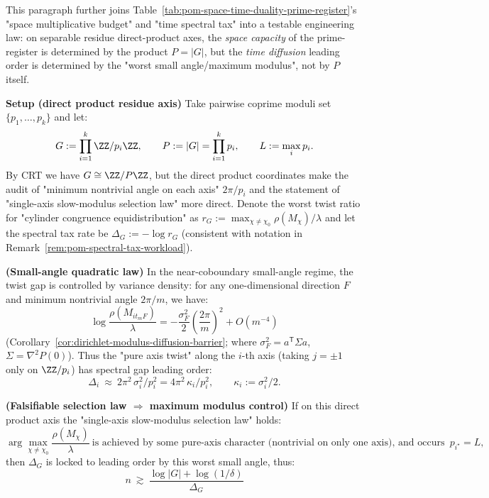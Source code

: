 \begin{remark}\label{rem:pom-max-modulus-control-law}
This paragraph further joins Table~\ref{tab:pom-space-time-duality-prime-register}'s "space multiplicative budget" and "time spectral tax" into a testable engineering law: on separable residue direct-product axes, the \emph{space capacity} of the prime-register is determined by the product $P=|G|$, but the \emph{time diffusion} leading order is determined by the "worst small angle/maximum modulus", not by $P$ itself.
\par
\medskip\noindent\textbf{Setup (direct product residue axis)}
Take pairwise coprime moduli set $\{p_1,\dots,p_k\}$ and let:
\[
G:=\prod_{i=1}^k\ZZ/p_i\ZZ,
\qquad
P:=|G|=\prod_{i=1}^k p_i,
\qquad
L:=\max_i p_i.
\]
By CRT we have $G\cong \ZZ/P\ZZ$, but the direct product coordinates make the audit of "minimum nontrivial angle on each axis" $2\pi/p_i$ and the statement of "single-axis slow-modulus selection law" more direct.
Denote the worst twist ratio for "cylinder congruence equidistribution" as
\(
r_G:=\max_{\chi\neq\chi_0}\rho(M_\chi)/\lambda
\)
and let the spectral tax rate be
\(
\Delta_G:=-\log r_G
\)
(consistent with notation in Remark~\ref{rem:pom-spectral-tax-workload}).
\par
\medskip\noindent\textbf{(Small-angle quadratic law)}
In the near-coboundary small-angle regime, the twist gap is controlled by variance density: for any one-dimensional direction $F$ and minimum nontrivial angle $2\pi/m$, we have:
\[
\log\frac{\rho(M_{it_mF})}{\lambda}
=-\frac{\sigma_F^2}{2}\left(\frac{2\pi}{m}\right)^2+O(m^{-4})
\]
(Corollary~\ref{cor:dirichlet-modulus-diffusion-barrier}; where $\sigma_F^2=a^{\mathsf T}\Sigma a$, $\Sigma=\nabla^2P(0)$).
Thus the "pure axis twist" along the $i$-th axis (taking $j=\pm1$ only on $\ZZ/p_i$) has spectral gap leading order:
\[
\Delta_i\ \approx\ 2\pi^2\,\sigma_i^2/p_i^2
=4\pi^2\,\kappa_i/p_i^2,
\qquad \kappa_i:=\sigma_i^2/2.
\]
\par
\medskip\noindent\textbf{(Falsifiable selection law $\Rightarrow$ maximum modulus control)}
If on this direct product axis the "single-axis slow-modulus selection law" holds:
\[
\arg\max_{\chi\neq\chi_0}\frac{\rho(M_\chi)}{\lambda}
\ \text{is achieved by some pure-axis character (nontrivial on only one axis), and occurs at maximum modulus }p_{i^\star}=L,
\]
then $\Delta_G$ is locked to leading order by this worst small angle, thus:
\[
n\ \gtrsim\ \frac{\log|G|+\log(1/\delta)}{\Delta_G}
\]
\end{remark}
